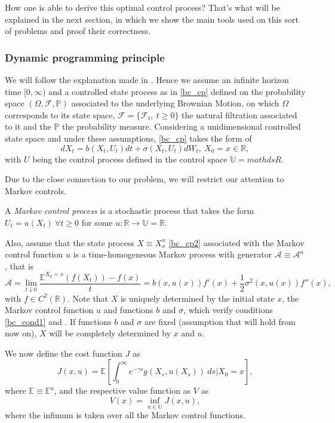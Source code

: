 How one is able to derive this optimal control process? That's what will be explained in the next section, in which we show the main tools used on this sort of problems and proof their correctness.

\subsubsection{Dynamic programming principle}

We will follow the explanation made in \cite{ross}. Hence we assume an infinite horizon time $[0,\infty)$ and a controlled state process as in \eqref{bc_cp} defined on the probability space $(\Omega,\mathcal{F}, \mathds{P})$ associated to the underlying Brownian Motion, on which $\Omega$ corresponds to its state space, $\mathcal{F}=\{\mathcal{F}_t, \ t\geq0 \}$ the natural filtration associated to it and the $\mathds{P}$ the probability measure. Considering a unidimensional controlled state space and under these assumptions, \eqref{bc_cp} takes the form of
\begin{equation}
 	d X_t=b(X_t,U_t)dt + \sigma (X_t,U_t)dW_t, \ X_0=x\in \mathds{R},
 \label{bc_cp2}
\end{equation} 
with $U$ being the control process defined in the control space $\mathds{U}=mathds{R}$.

Due to the close connection to our problem, we will restrict our attention to Markov controls.
\begin{defi}
	A \textit{Markov control process} is a stochastic process that takes the
	form $U_t=u(X_t) \ \forall t \geq 0$ for some $u: \mathds{R} \rightarrow \mathds{U}=\mathds{R}$.
\end{defi}

Also, assume that the state process $X \equiv X_x^u$ \eqref{bc_cp2} associated with the Markov control function $u$ is a time-homogeneous Markov process with generator $\mathcal{A} \equiv \mathcal{A}^u$, that is
$$\mathcal{A}=\lim_{t\downarrow 0} \frac{\mathds{E}^{X_0=x}(f(X_t))-f(x)}{t}=b(x,u(x)) f'(x)+\frac{1}{2}\sigma^2(x,u(x))f''(x),$$
with $f \in C^2(\mathds{R})$. Note that $X$ is uniquely determined by the initial state $x$, the Markov control function $u$ and functions $b$ and $\sigma$, which verify conditions \eqref{bc_cond1} and . If functions $b$ and $\sigma$ are fixed (assumption that will hold from now on), $X$ will be completely determined by $x$ and $u$.

We now define the cost function $J$ as
\begin{equation}
	 J(x,u)=\mathds{E}\left[ \int^\infty_0 e^{-\gamma s} g(X_s,u(X_s)) \ ds | X_0=x \right],
	 \label{bc_J}
\end{equation}
where $\mathds{E} \equiv \mathds{E}^u$, and the respective value function as $V$ as
\begin{equation}
	V(x)=\inf_{u \in \mathds{U}} J(x,u),
	\label{bc_V}
\end{equation}
where the infimum is taken over all the Markov control functions.

